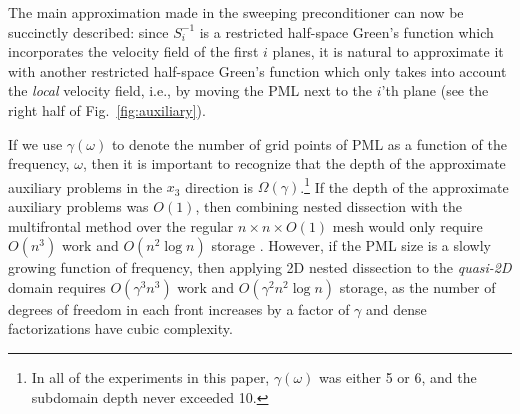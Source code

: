 The main approximation made in the sweeping preconditioner can now be 
succinctly described: since $S_i^{-1}$ is a restricted half-space Green's 
function which incorporates the velocity field of the first $i$ planes, it is 
natural to approximate it with another restricted half-space
Green's function which only takes into account the {\em local} velocity field,
i.e., by moving the PML next to the $i$'th plane (see the right half of 
Fig.~\ref{fig:auxiliary}). 



If we use $\gamma(\omega)$ to denote the number of grid points of PML as a 
function of the frequency, $\omega$, then it is 
important to recognize that the depth of the approximate auxiliary problems
in the $x_3$ direction is $\Omega(\gamma)$.\footnote{In all of the experiments 
in this paper, $\gamma(\omega)$ was either 5 or 6, and the subdomain depth 
never exceeded 10.}
If the depth of the approximate auxiliary problems was $O(1)$, then 
combining nested dissection with the multifrontal method over the regular 
$n \times n \times O(1)$ mesh would only require $O(n^3)$
work and $O(n^2 \log n)$ storage \cite{George-nested}. 
However, if the PML size is a slowly growing function of frequency, then 
applying 2D nested dissection to the {\em quasi-2D} domain requires 
$O(\gamma^3 n^3)$ work and $O(\gamma^2 n^2 \log n)$ storage,
as the number of degrees of freedom in each front increases by a factor of 
$\gamma$ and dense factorizations have cubic complexity.

